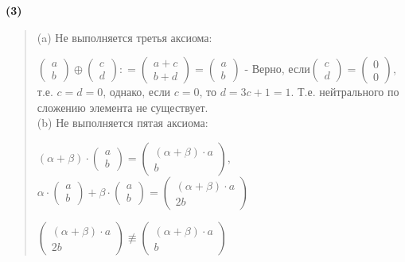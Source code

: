 \documentclass{article}
\begin{document}
\textsf{\textbf{(3)}}
\begin{quote}
    (a) Не выполняется третья аксиома:

    $\begin{pmatrix} a\\ b\end{pmatrix} \oplus \begin{pmatrix} c\\ d\end{pmatrix}: = \begin{pmatrix} a+c\\ b+d\end{pmatrix} = \begin{pmatrix} a \\ b \end{pmatrix} $ - Верно, если$ \begin{pmatrix} c \\ d \end{pmatrix} = \begin{pmatrix} 0 \\ 0\end{pmatrix}$, т.е. $c = d = 0$, однако, если $c = 0$, то $d = 3c + 1 = 1$. Т.е. нейтрального по сложению элемента не существует.\\
    
    (b) Не выполняется пятая аксиома:
    
     $(\alpha + \beta) \cdot \begin{pmatrix} a \\ b \end{pmatrix} = 
     \begin{pmatrix} (\alpha + \beta) \cdot a \\ b \end{pmatrix}$, \qquad
     $\alpha \cdot \begin{pmatrix} a \\ b \end{pmatrix} + \beta \cdot \begin{pmatrix} a \\ b \end{pmatrix} = 
     \begin{pmatrix} (\alpha + \beta)\cdot a \\ 2b \end{pmatrix}$

     $\begin{pmatrix} (\alpha + \beta)\cdot a \\ 2b \end{pmatrix} \not \equiv \begin{pmatrix} (\alpha + \beta)\cdot a \\ b \end{pmatrix}$
     

\end{quote}
\end{document}
